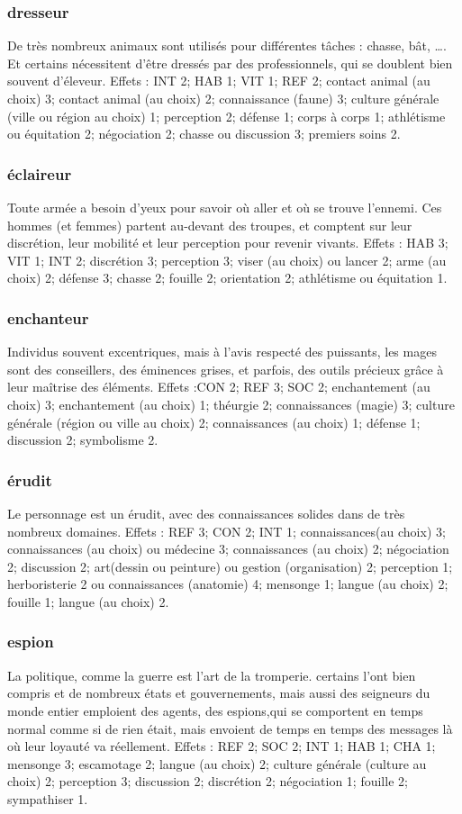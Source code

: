 \documentclass[10pt,a4paper,twocolumn]{book}
\begin{document}
\subsubsection{dresseur}
De très nombreux animaux sont utilisés pour différentes tâches : chasse, bât, …. Et certains nécessitent d’être dressés par des professionnels, qui se doublent bien souvent d’éleveur.
Effets : INT 2; HAB 1; VIT 1; REF 2; contact animal (au choix) 3; contact animal (au choix) 2; connaissance (faune) 3; culture générale (ville ou région au choix) 1; perception 2; défense 1; corps à corps 1; athlétisme ou équitation 2; négociation 2; chasse ou discussion 3; premiers soins 2.
\subsubsection{éclaireur}
Toute armée a besoin d’yeux pour savoir où aller et où se trouve l’ennemi. Ces hommes (et femmes) partent au-devant des troupes, et comptent sur leur discrétion, leur mobilité et leur perception pour revenir vivants.
Effets : HAB 3; VIT 1; INT 2; discrétion 3; perception 3; viser (au choix) ou lancer 2; arme (au choix) 2; défense 3; chasse 2; fouille 2; orientation 2; athlétisme ou équitation 1. 
\subsubsection{enchanteur}
Individus souvent excentriques, mais à l’avis respecté des puissants, les mages sont des conseillers, des éminences grises, et parfois, des outils précieux grâce à leur maîtrise des éléments.
Effets :CON 2; REF 3; SOC 2; enchantement (au choix) 3; enchantement (au choix) 1; théurgie 2; connaissances (magie) 3; culture générale (région ou ville au choix) 2; connaissances (au choix) 1; défense 1; discussion 2; symbolisme 2.
\subsubsection{érudit}
Le personnage est un érudit, avec des connaissances solides dans de très nombreux domaines.
Effets : REF 3; CON 2; INT 1; connaissances(au choix) 3; connaissances (au choix) ou médecine 3; connaissances (au choix) 2; négociation 2; discussion 2; art(dessin ou peinture) ou gestion (organisation) 2; perception 1; herboristerie 2 ou connaissances (anatomie) 4; mensonge 1; langue (au choix) 2; fouille 1; langue (au choix) 2.
\subsubsection{espion}
La politique, comme la guerre est l’art de la tromperie. certains l’ont bien compris et de nombreux états et gouvernements, mais aussi des seigneurs du monde entier emploient des agents, des espions,qui se comportent en temps normal comme si de rien était, mais envoient de temps en temps des messages là où leur loyauté va réellement.
Effets : REF 2; SOC 2; INT 1; HAB 1; CHA 1; mensonge 3; escamotage 2; langue (au choix) 2; culture générale (culture au choix) 2; perception 3; discussion 2; discrétion 2; négociation 1; fouille 2; sympathiser 1.
\end{document}
